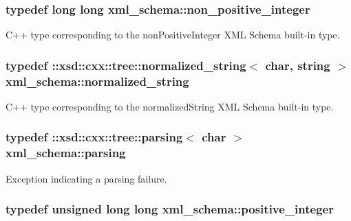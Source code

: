 \hypertarget{namespacexml__schema_a3de6073e510eb8edd71ddc6e0256e2f9}{
\subsubsection[{non\+\_\+positive\+\_\+integer}]{\setlength{\rightskip}{0pt plus 5cm}typedef long long {\bf xml\+\_\+schema\+::non\+\_\+positive\+\_\+integer}}}\label{namespacexml__schema_a3de6073e510eb8edd71ddc6e0256e2f9}


C++ type corresponding to the non\+Positive\+Integer X\+M\+L Schema built-\/in type. 

\hypertarget{namespacexml__schema_a429c44c2779bb6c82332127aa59c61fe}{
\subsubsection[{normalized\+\_\+string}]{\setlength{\rightskip}{0pt plus 5cm}typedef \+::xsd\+::cxx\+::tree\+::normalized\+\_\+string$<$ char, {\bf string} $>$ {\bf xml\+\_\+schema\+::normalized\+\_\+string}}}\label{namespacexml__schema_a429c44c2779bb6c82332127aa59c61fe}


C++ type corresponding to the normalized\+String X\+M\+L Schema built-\/in type. 

\hypertarget{namespacexml__schema_a150f88d7d2156ae81807b142038684f5}{
\subsubsection[{parsing}]{\setlength{\rightskip}{0pt plus 5cm}typedef \+::xsd\+::cxx\+::tree\+::parsing$<$ char $>$ {\bf xml\+\_\+schema\+::parsing}}}\label{namespacexml__schema_a150f88d7d2156ae81807b142038684f5}


Exception indicating a parsing failure. 

\hypertarget{namespacexml__schema_abe9d639a15a121d2868ae2f9c974ca24}{
\subsubsection[{positive\+\_\+integer}]{\setlength{\rightskip}{0pt plus 5cm}typedef unsigned long long {\bf xml\+\_\+schema\+::positive\+\_\+integer}}}\label{namespacexml__schema_abe9d639a15a121d2868ae2f9c974ca24}


